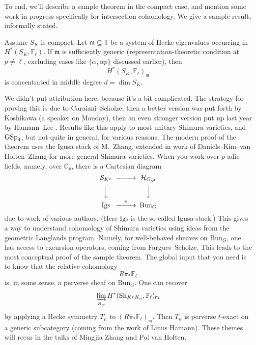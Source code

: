 \documentclass[reqno]{amsart} 
\begin{document}
To end, we'll describe a sample theorem in the compact case, and mention some work in progress specifically for intersection cohomology.  We give a sample result, informally stated.
\begin{theorem}
  Assume $S_K$ is compact.  Let $\mathfrak{m} \subseteq \mathbb{T}$ be a system of Hecke eigenvalues occurring in $H^\ast(S_K, \mathbb{F}_{\ell})$.  If $\mathfrak{m}$ is sufficiently generic (representation-theoretic condition at $p \neq \ell$, excluding cases like $\{\alpha, \alpha p\}$ discussed earlier), then
  \begin{equation*}
    H^\ast(S_K, \mathbb{F}_{\ell})_{\mathfrak{m}}
  \end{equation*}
  is concentrated in middle degree $d = \dim S_K$.
\end{theorem}
We didn't put attribution here, because it's a bit complicated.  The strategy for proving this is due to Caraiani--Scholze, then a better version was put forth by Koshikawa (a speaker on Monday), then an even stronger version put up last year by Hamann--Lee \cite{2023arXiv2309.08705}.  Results like this apply to most unitary Shimura varieties, and $\operatorname{GSp}_4$, but not quite in general, for various reasons.  The modern proof of the theorem uses the Igusa stack of M.\ Zhang, extended in work of Daniels--Kim--van Hoften--Zhang for more general Shimura varieties.  When you work over $p$-adic fields, namely, over $\mathbb{C}_p$, there is a Cartesian diagram
\begin{equation*}
  \begin{CD}         
    \mathcal{S}_{K^p}    @>>> \mathcal{H}_{G, \mu}\\
    @VVV  @VVV \\
    \mathrm{Igs} @>\bar{\pi}>> \mathrm{Bun}_G\\
  \end{CD}
\end{equation*}
due to work of various authors.  (Here $\mathrm{Igs}$ is the so-called Igusa stack.)  This gives a way to understand cohomology of Shimura varieties using ideas from the geometric Langlands program.  Namely, for well-behaved sheaves on $\mathrm{Bun}_G$, one has access to excursion operators, coming from Fargues--Scholze.  This leads to the most conceptual proof of the sample theorem.  The global input that you need is to know that the relative cohomology
\begin{equation*}
  R \bar{\pi}_\ast \mathbb{F}_{\ell}
\end{equation*}
is, in some sense, a perverse sheaf on $\mathrm{Bun}_G$.  One can recover
\begin{equation*}
  \varinjlim_{K_p} H^\ast(\mathrm{Sh}_{K^p K_p}, \mathbb{F}_{\ell})_{\mathfrak{m}}
\end{equation*}
by applying a Hecke symmetry $T_\mu$ to $(R \bar{\pi}_\ast \mathbb{F}_{\ell})_{\mathfrak{m}}$.  Then $T_\mu$ is perverse $t$-exact on a generic subcategory (coming from the work of Linus Hamann).  These themes will recur in the talks of Mingjia Zhang and Pol van Hoften.
\end{document}
